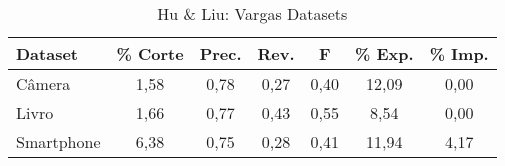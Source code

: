 \begin{table}[!htb]
\centering
\caption{Hu \& Liu: Vargas Datasets}
\label{tab:huLiuinfW2V}
\begin{tabular}{lcccccc}
    \hline
    Dataset &  \% Corte & Prec. & Rev. & F & \% Exp. & \% Imp.   \\ \hline
Câmera     &  1,58 &  0,78 & 0,27 & 0,40 & 12,09 & 0,00 \\
Livro      &  1,66 &  0,77 & 0,43 & 0,55 & 8,54 & 0,00 \\
Smartphone &  6,38 &  0,75 & 0,28 & 0,41 & 11,94 & 4,17 \\ \hline
\end{tabular}
\end{table}
